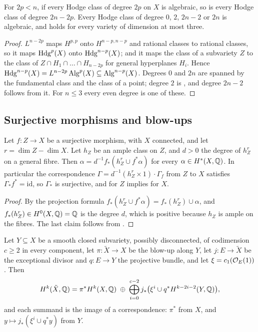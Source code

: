 \begin{proposition}\label{prop:hardlef}
For $2p<n$, if every Hodge class of degree $2p$ on $X$ is algebraic, so is
every Hodge class of degree $2n-2p$. Every Hodge class of degree $0$, $2$,
$2n-2$ or $2n$ is algebraic, and \HC{} holds for every variety of dimension
at most three.
\end{proposition}

\begin{proof}
$L^{n-2p}$ maps $H^{p,p}$ onto $H^{n-p,n-p}$ and rational classes to rational
classes, so it maps $\operatorname{Hdg}^{p}(X)$ onto $\operatorname{Hdg}^{n-p}(X)$; and it maps the class
of a subvariety $Z$ to the class of $Z\cap H_{1}\cap\dots\cap H_{n-2p}$ for
general hyperplanes $H_{i}$. Hence
$\operatorname{Hdg}^{n-p}(X)=L^{n-2p}\operatorname{Alg}^{p}(X)\subseteq\operatorname{Alg}^{n-p}(X)$. Degrees $0$ and
$2n$ are spanned by the fundamental class and the class of a point; degree
$2$ is , and degree $2n-2$ follows from it. For $n\le3$
every even degree is one of these.
\end{proof}

\subsection{Surjective morphisms and blow-ups}

\begin{proposition}\label{prop:descent}
Let $f\colon Z\to X$ be a surjective morphism, with $X$ connected, and let
$r=\dim Z-\dim X$. Let $h_{Z}$ be an ample class on $Z$, and $d>0$ the degree
of $h_{Z}^{r}$ on a general fibre. Then $\alpha=d^{-1}f_{*}(h_{Z}^{r}\cup
f^{*}\alpha)$ for every $\alpha\in H^{*}(X,\mathbb{Q})$. In particular the
correspondence $\Gamma=d^{-1}(h_{Z}^{r}\times1)\cdot\Gamma_{f}$ from $Z$ to
$X$ satisfies $\Gamma_{*}f^{*}=\mathrm{id}$, so $\Gamma_{*}$ is surjective,
and \HC{} for $Z$ implies \HC{} for $X$.
\end{proposition}

\begin{proof}
By the projection formula
$f_{*}(h_{Z}^{r}\cup f^{*}\alpha)=f_{*}(h_{Z}^{r})\cup\alpha$, and
$f_{*}(h_{Z}^{r})\in H^{0}(X,\mathbb{Q})=\mathbb{Q}$ is the degree $d$, which is positive
because $h_{Z}$ is ample on the fibres. The last claim follows from
.
\end{proof}

\begin{proposition}\label{prop:blowup}
Let $Y\subseteq X$ be a smooth closed subvariety, possibly disconnected, of
codimension $c\ge2$ in every component, let $\pi\colon\tilde X\to X$ be the
blow-up along $Y$, let $j\colon E\to\tilde X$ be the exceptional divisor and
$q\colon E\to Y$ the projective bundle, and let $\xi=c_{1}(\mathcal{O}_{E}(1))$. Then
\[
  H^{k}(\tilde X,\mathbb{Q})=\pi^{*}H^{k}(X,\mathbb{Q})\;\oplus\;
  \bigoplus_{i=0}^{c-2}j_{*}\bigl(\xi^{i}\cup q^{*}H^{k-2i-2}(Y,\mathbb{Q})\bigr),
\]
and each summand is the image of a correspondence: $\pi^{*}$ from $X$, and
$y\mapsto j_{*}(\xi^{i}\cup q^{*}y)$ from $Y$.
\end{proposition}

